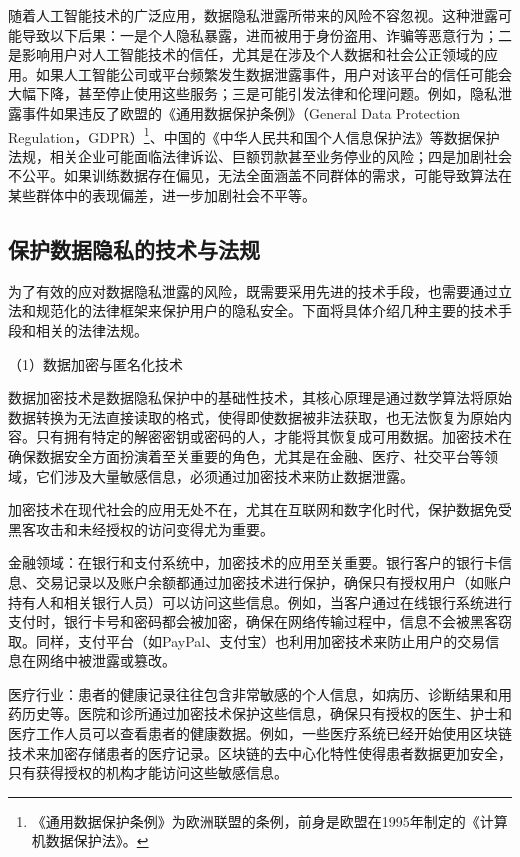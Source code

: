 随着人工智能技术的广泛应用，数据隐私泄露所带来的风险不容忽视。这种泄露可能导致以下后果：一是个人隐私暴露，进而被用于身份盗用、诈骗等恶意行为；二是影响用户对人工智能技术的信任，尤其是在涉及个人数据和社会公正领域的应用。如果人工智能公司或平台频繁发生数据泄露事件，用户对该平台的信任可能会大幅下降，甚至停止使用这些服务；三是可能引发法律和伦理问题。例如，隐私泄露事件如果违反了欧盟的《通用数据保护条例》（General Data Protection Regulation，GDPR）\footnote{《通用数据保护条例》为欧洲联盟的条例，前身是欧盟在1995年制定的《计算机数据保护法》。}、中国的《中华人民共和国个人信息保护法》等数据保护法规，相关企业可能面临法律诉讼、巨额罚款甚至业务停业的风险；四是加剧社会不公平。如果训练数据存在偏见，无法全面涵盖不同群体的需求，可能导致算法在某些群体中的表现偏差，进一步加剧社会不平等。

\subsection{保护数据隐私的技术与法规}
为了有效的应对数据隐私泄露的风险，既需要采用先进的技术手段，也需要通过立法和规范化的法律框架来保护用户的隐私安全。下面将具体介绍几种主要的技术手段和相关的法律法规。

（1）数据加密与匿名化技术

数据加密技术是数据隐私保护中的基础性技术，其核心原理是通过数学算法将原始数据转换为无法直接读取的格式，使得即使数据被非法获取，也无法恢复为原始内容。只有拥有特定的解密密钥或密码的人，才能将其恢复成可用数据。加密技术在确保数据安全方面扮演着至关重要的角色，尤其是在金融、医疗、社交平台等领域，它们涉及大量敏感信息，必须通过加密技术来防止数据泄露。

加密技术在现代社会的应用无处不在，尤其在互联网和数字化时代，保护数据免受黑客攻击和未经授权的访问变得尤为重要。

金融领域：在银行和支付系统中，加密技术的应用至关重要。银行客户的银行卡信息、交易记录以及账户余额都通过加密技术进行保护，确保只有授权用户（如账户持有人和相关银行人员）可以访问这些信息。例如，当客户通过在线银行系统进行支付时，银行卡号和密码都会被加密，确保在网络传输过程中，信息不会被黑客窃取。同样，支付平台（如PayPal、支付宝）也利用加密技术来防止用户的交易信息在网络中被泄露或篡改。

医疗行业：患者的健康记录往往包含非常敏感的个人信息，如病历、诊断结果和用药历史等。医院和诊所通过加密技术保护这些信息，确保只有授权的医生、护士和医疗工作人员可以查看患者的健康数据。例如，一些医疗系统已经开始使用区块链技术来加密存储患者的医疗记录。区块链的去中心化特性使得患者数据更加安全，只有获得授权的机构才能访问这些敏感信息。

